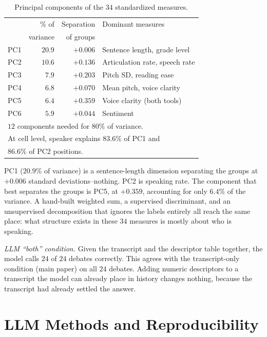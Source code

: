 \documentclass[pdflatex,sn-apa]{sn-jnl}%
\begin{document}
\begin{table}[!htbp]
\caption{Principal components of the $34$ standardized measures.}
\label{s:tab:pca}
\centering
\footnotesize
\setlength{\tabcolsep}{3pt}
\begin{tabular}{lrrl}
\toprule
 & \% of & Separation & Dominant measures \\
 & variance & of groups & \\
\midrule
PC1 & $20.9$ & $+0.006$ & Sentence length, grade level \\
PC2 & $10.6$ & $+0.136$ & Articulation rate, speech rate \\
PC3 & $7.9$  & $+0.203$ & Pitch SD, reading ease \\
PC4 & $6.8$  & $+0.070$ & Mean pitch, voice clarity \\
PC5 & $6.4$  & $+0.359$ & Voice clarity (both tools) \\
PC6 & $5.9$  & $+0.044$ & Sentiment \\
\midrule
\multicolumn{4}{l}{$12$ components needed for $80\%$ of variance.} \\
\multicolumn{4}{l}{At cell level, speaker explains $83.6\%$ of PC1 and} \\
\multicolumn{4}{l}{$86.6\%$ of PC2 positions.} \\
\bottomrule
\end{tabular}
\end{table}

PC1 ($20.9\%$ of variance) is a sentence-length dimension separating the
groups at $+0.006$ standard deviations--nothing. PC2 is speaking rate. The
component that best separates the groups is PC5, at $+0.359$, accounting for
only $6.4\%$ of the variance. A hand-built weighted sum, a supervised
discriminant, and an unsupervised decomposition that ignores the labels
entirely all reach the same place: what structure exists in these $34$
measures is mostly about who is speaking.

\emph{LLM ``both'' condition.} Given the transcript and the descriptor
table together, the model calls $24$ of $24$ debates correctly. This
agrees with the transcript-only condition (main paper) on all $24$
debates. Adding numeric descriptors to a transcript the model can already
place in history changes nothing, because the transcript had already
settled the answer.

\section{LLM Methods and Reproducibility}
\label{s:llmrepro}
\end{document}
